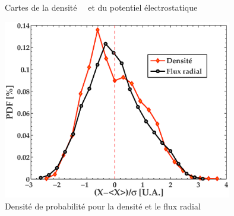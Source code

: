 \begin{refsection}
\begin{figure}
    \centering
    \caption{Cartes de la densité ~~et du potentiel
    électrostatique
    }
    \label{2-CartesBase}
\end{figure}

\begin{figure}[htbp]
\centering
    \includegraphics[width=10cm]{figures/2-PDFBase.eps}
    \caption{Densité de probabilité pour la densité et le flux radial}
    \label{2-PDFBase}
\end{figure}



\end{refsection}
